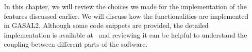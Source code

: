 In this chapter, we will review the choices we made for the implementation of the features discussed earlier. We will discuss how the functionalities are implemented in GASAL2. Although some code snippets are provided, the detailed implementation is available at~\cite{j-levy:bwa-gasal2} and reviewing it can be helpful to understand the coupling between different parts of the software.